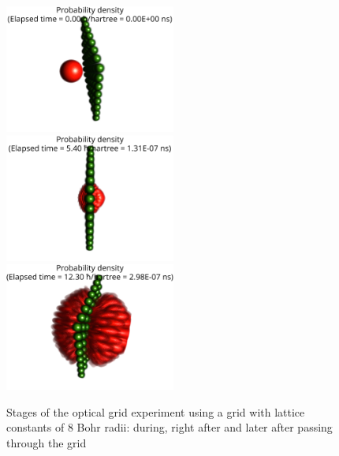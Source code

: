 \begin{figure}
	\begin{center}
		\includegraphics[width=0.5\textwidth]{figures/optical_grid_8_bohr_rad_01.png}
		\includegraphics[width=0.5\textwidth]{figures/optical_grid_8_bohr_rad_02.png}
		\includegraphics[width=0.5\textwidth]{figures/optical_grid_8_bohr_rad_03.png}
		\caption{Stages of the optical grid experiment using a grid with lattice constants of $8$ Bohr radii: during, right after and later after passing through the grid}
		\label{fig:optical_grid_stages_8_bohr_radii}
	\end{center}	
\end{figure}

